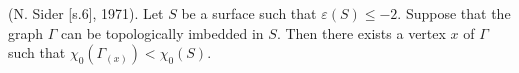 (N. Sider [s.6], 1971). Let $S$ be a surface such that $\varepsilon(S) \leq -2$. Suppose that the graph $\Gamma$ can be topologically imbedded in $S$. Then there exists a vertex $x$ of $\Gamma$ such that $\chi_0(\Gamma_{(x)}) < \chi_0(S)$.
